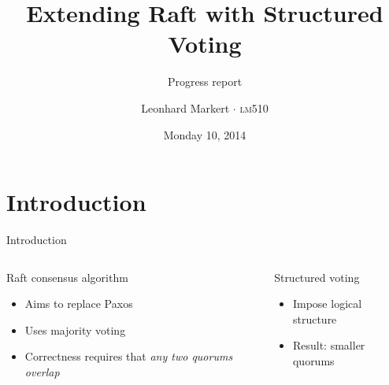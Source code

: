 \documentclass{beamer}
\title{Extending Raft with Structured Voting}
\subtitle{Progress report}
\author{Leonhard Markert \(\cdot\) \textsc{lm510}}
\date{Monday 10, 2014}
\begin{document}

\begin{frame}
    \titlepage
\end{frame}


\section{Introduction}
\begin{frame}{Introduction}
    \begin{columns}[t]
        \begin{column}{.47\textwidth}
            \begin{block}{Raft consensus algorithm}
                \begin{itemize}
                    \item Aims to replace Paxos
                    \item Uses majority voting
                    \item Correctness requires that \emph{any two quorums overlap}
                \end{itemize}
            \end{block}
        \end{column}
        \begin{column}{.53\textwidth}
            \begin{block}{Structured voting}
                \begin{itemize}
                    \item Impose logical structure
                    \item Result: smaller quorums
                \end{itemize}


\end{block}
\end{column}
\end{columns}
\end{frame}
\end{document}
